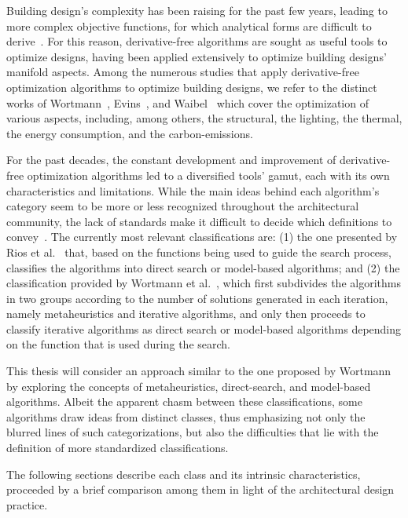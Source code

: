 	Building design's complexity has been raising for the past few years, leading to more complex objective functions, for which analytical forms are difficult to derive~\cite{Machairas2014}. For this reason, derivative-free algorithms are sought as useful tools to optimize designs, having been applied extensively to optimize building designs' manifold aspects. Among the numerous studies that apply derivative-free optimization algorithms to optimize building designs, we refer to the distinct works of Wortmann~\cite{Wortmann2016BBO,Wortmann2015AdvSBO,Wortmann2017GABESTCHOICE,Wortmann2017Opossum}, Evins~\cite{Evins2011,Evins2012MOO,Evins2013}, and Waibel~\cite{Waibel2018} which cover the optimization of various aspects, including, among others, the structural, the lighting, the thermal, the energy consumption, and the carbon-emissions. 
	
	For the past decades, the constant development and improvement of derivative-free optimization algorithms led to a diversified tools' gamut, each with its own characteristics and limitations. While the main ideas behind each algorithm's category seem to be more or less recognized throughout the architectural community, the lack of standards make it difficult to decide which definitions to convey~\cite{Rios2013, Wortmann2017ADO}. The currently most relevant classifications are: (1) the one presented by Rios et al.~\cite{Rios2013} that, based on the functions being used to guide the search process, classifies the algorithms into direct search or model-based algorithms; and (2) the classification provided by Wortmann et al.~\cite{Wortmann2017ADO}, which first subdivides the algorithms in two groups according to the number of solutions generated in each iteration, namely metaheuristics and iterative algorithms, and only then proceeds to classify iterative algorithms as direct search or model-based algorithms depending on the function that is used during the search. 

	This thesis will consider an approach similar to the one proposed by Wortmann~\cite{Wortmann2017ADO} by exploring the concepts of metaheuristics, direct-search, and model-based algorithms. Albeit the apparent chasm between these classifications, some algorithms draw ideas from distinct classes, thus emphasizing not only the blurred lines of such categorizations, but also the difficulties that lie with the definition of more standardized classifications. 
	
	The following sections describe each class and its intrinsic characteristics, proceeded by a brief comparison among them in light of the architectural design practice. 	

